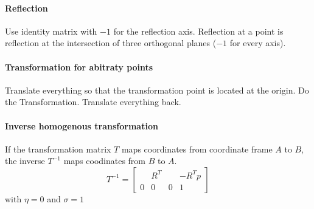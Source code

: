 \documentclass[12pt]{article}
\begin{document}
	\paragraph{Reflection} Use identity matrix with $-1$ for the reflection axis. Reflection at a point is reflection at the intersection of three orthogonal planes ($-1$ for every axis).

	\paragraph{Transformation for abitraty points} Translate everything so that the transformation point is located at the origin. Do the Transformation. Translate everything back.
	
	\paragraph{Inverse homogenous transformation} If the transformation matrix $T$ maps coordinates from coordinate frame $A$ to $B$, the inverse $T^{-1}$ maps coodinates from $B$ to $A$.
	\begin{equation}
	T^{-1} = 
	\begin{bmatrix}
	& R^T & & -R^T p\\
	0 & 0 & 0 & 1
	\end{bmatrix}
	\end{equation}
	with $\eta = 0$ and $\sigma = 1$
	
\end{document}
